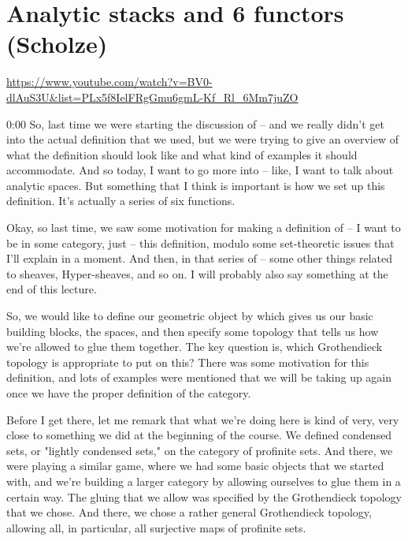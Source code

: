
\section{\ufs Analytic stacks and 6 functors (Scholze)}

\url{https://www.youtube.com/watch?v=BV0-dlAuS3U&list=PLx5f8IelFRgGmu6gmL-Kf_Rl_6Mm7juZO}
\renewcommand{\yt}[2]{\href{https://www.youtube.com/watch?v=BV0-dlAuS3U&list=PLx5f8IelFRgGmu6gmL-Kf_Rl_6Mm7juZO&t=#1}{#2}}
\vspace{1em}

\begin{unfinished}{0:00}
So, last time we were starting the discussion of -- and we really didn't get into the actual definition that we used, but we were trying to give an overview of what the definition should look like and what kind of examples it should accommodate. And so today, I want to go more into -- like, I want to talk about analytic spaces. But something that I think is important is how we set up this definition. It's actually a series of six functions.

Okay, so last time, we saw some motivation for making a definition of -- I want to be in some category, just -- this definition, modulo some set-theoretic issues that I'll explain in a moment. And then, in that series of -- some other things related to sheaves, Hyper-sheaves, and so on. I will probably also say something at the end of this lecture.

So, we would like to define our geometric object by which gives us our basic building blocks, the spaces, and then specify some topology that tells us how we're allowed to glue them together. The key question is, which Grothendieck topology is appropriate to put on this? There was some motivation for this definition, and lots of examples were mentioned that we will be taking up again once we have the proper definition of the category.

Before I get there, let me remark that what we're doing here is kind of very, very close to something we did at the beginning of the course. We defined condensed sets, or "lightly condensed sets," on the category of profinite sets. And there, we were playing a similar game, where we had some basic objects that we started with, and we're building a larger category by allowing ourselves to glue them in a certain way. The gluing that we allow was specified by the Grothendieck topology that we chose. And there, we chose a rather general Grothendieck topology, allowing all, in particular, all surjective maps of profinite sets.


\end{unfinished}
